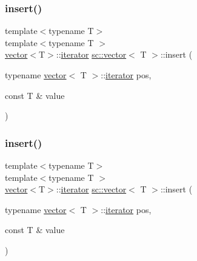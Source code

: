 \subsubsection{\texorpdfstring{insert()}{insert()}\hspace{0.1cm}{\footnotesize\ttfamily [4/9]}}
{\footnotesize\ttfamily template$<$typename T$>$ \\
template$<$typename T $>$ \\
\mbox{\hyperlink{classsc_1_1vector}{vector}}$<$T$>$\+::\mbox{\hyperlink{classsc_1_1vector_1_1iterator}{iterator}} \mbox{\hyperlink{classsc_1_1vector}{sc\+::vector}}$<$ T $>$\+::insert (\begin{DoxyParamCaption}\item[{typename \mbox{\hyperlink{classsc_1_1vector}{vector}}$<$ T $>$\+::\mbox{\hyperlink{classsc_1_1vector_1_1iterator}{iterator}}}]{pos,  }\item[{const T \&}]{value }\end{DoxyParamCaption})}

\mbox{\label{classsc_1_1vector_a1aaf0a1fcdac2a58a96a2a00105b2e1f}} 
\subsubsection{\texorpdfstring{insert()}{insert()}\hspace{0.1cm}{\footnotesize\ttfamily [5/9]}}
{\footnotesize\ttfamily template$<$typename T$>$ \\
template$<$typename T $>$ \\
\mbox{\hyperlink{classsc_1_1vector}{vector}}$<$T$>$\+::\mbox{\hyperlink{classsc_1_1vector_1_1iterator}{iterator}} \mbox{\hyperlink{classsc_1_1vector}{sc\+::vector}}$<$ T $>$\+::insert (\begin{DoxyParamCaption}\item[{typename \mbox{\hyperlink{classsc_1_1vector}{vector}}$<$ T $>$\+::\mbox{\hyperlink{classsc_1_1vector_1_1iterator}{iterator}}}]{pos,  }\item[{const T \&}]{value }\end{DoxyParamCaption})}

\mbox{\label{classsc_1_1vector_a774a81ea7131584862592c29a8137e28}} 
